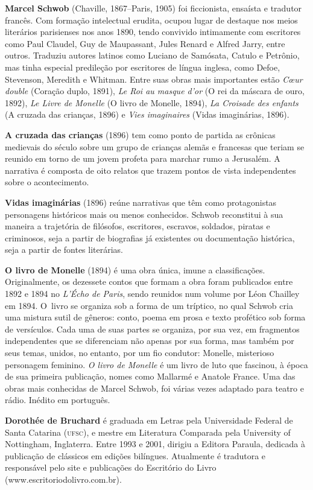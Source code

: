 \textbf{Marcel Schwob} (Chaville, 1867--Paris, 1905) foi ficcionista, ensaísta e tradutor francês. 
Com formação intelectual erudita, ocupou lugar de destaque nos meios literários parisienses
nos anos 1890, tendo convivido intimamente com escritores como Paul Claudel,
Guy de Maupassant, Jules Renard e Alfred Jarry, entre outros. Traduziu autores
latinos como Luciano de Samósata, Catulo e Petrônio, mas tinha especial
predileção por escritores de língua inglesa, como Defoe, Stevenson, Meredith e
Whitman. Entre suas obras mais importantes estão \textit{Cœur double}
(Coração duplo, 1891), \textit{Le Roi au masque d’or} (O rei
da máscara de ouro, 1892), \textit{Le Livre de Monelle} (O livro de
Monelle, 1894), \textit{La Croisade des enfants} (A cruzada das
crianças, 1896) e \textit{Vies imaginaires} (Vidas imaginárias, 1896).

\textbf{A cruzada das crianças} (1896) tem como ponto de partida as crônicas medievais do século  
sobre um grupo de crianças alemãs e francesas que teriam se reunido em torno de um jovem profeta para
marchar rumo a Jerusalém. A narrativa é composta de oito relatos que trazem
pontos de vista independentes sobre o acontecimento.

\textbf{Vidas imaginárias} (1896) reúne narrativas que têm como protagonistas personagens históricos
mais ou menos conhecidos. Schwob reconstitui à sua maneira a trajetória de
filósofos, escritores, escravos, soldados, piratas e criminosos, seja a partir
de biografias já existentes ou documentação histórica, seja a
partir de fontes literárias.

\textbf{O livro de Monelle} (1894) é uma obra única, imune a classificações. Originalmente, os dezessete 
contos que formam a obra foram publicados entre 1892 e 1894 no \textit{L'Écho de Paris}, sendo reunidos num volume 
por Léon Chailley em 1894. \mbox{O livro} se organiza sob a forma de um tríptico, no qual Schwob cria uma mistura sutil de
gêneros: conto, poema em prosa e texto profético sob forma de versículos. Cada
uma de suas partes se organiza, por sua vez, em fragmentos independentes que se
diferenciam não apenas por sua forma, mas também por seus temas, unidos, no
entanto, por um fio condutor: Monelle, misterioso personagem feminino. \textit{O livro
de Monelle} é um livro de luto que fascinou, à época de sua
primeira publicação, nomes como Mallarmé e Anatole France. Uma das obras mais
conhecidas de Marcel Schwob, foi várias vezes adaptado para
teatro e rádio. Inédito em português.
        

\textbf{Dorothée de Bruchard} é graduada em Letras pela Universidade Federal
de Santa Catarina (\textsc{ufsc}), e mestre em Literatura Comparada pela University of
Nottingham, Inglaterra. Entre 1993 e 2001, dirigiu a Editora Paraula, dedicada à
publicação de clássicos em edições bilíngues. Atualmente é tradutora e responsável pelo 
site e publicações do Escritório do Livro (www.escritoriodolivro.com.br).

